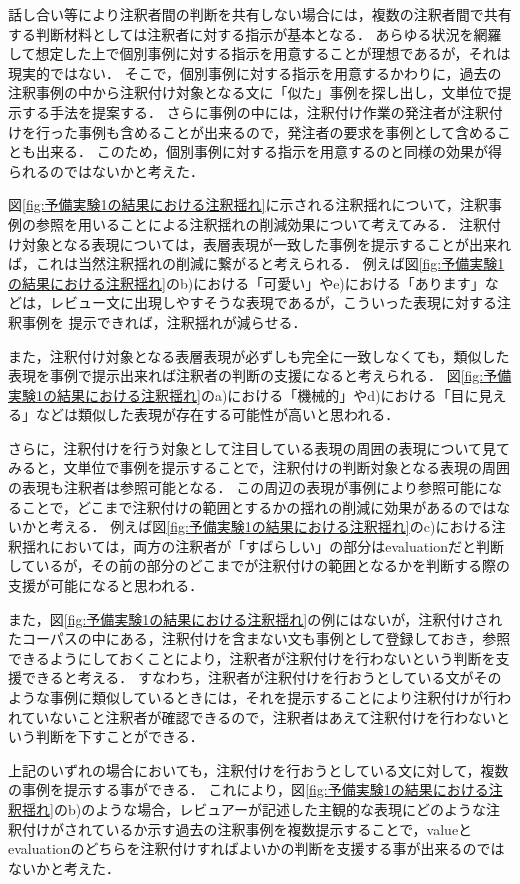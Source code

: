 \documentclass[japanese]{jnlp_1.4}
\begin{document}
話し合い等により注釈者間の判断を共有しない場合には，複数の注釈者間で共有する判断材料としては注釈者に対する指示が基本となる．
あらゆる状況を網羅して想定した上で個別事例に対する指示を用意することが理想であるが，それは現実的ではない．
そこで，個別事例に対する指示を用意するかわりに，過去の注釈事例の中から注釈付け対象となる文に「似た」事例を探し出し，文単位で提示する手法を提案する．
さらに事例の中には，注釈付け作業の発注者が注釈付けを行った事例も含めることが出来るので，発注者の要求を事例として含めることも出来る．
このため，個別事例に対する指示を用意するのと同様の効果が得られるのではないかと考えた．

図\ref{fig:予備実験1の結果における注釈揺れ}に示される注釈揺れについて，注釈事例の参照を用いることによる注釈揺れの削減効果について考えてみる．
注釈付け対象となる表現については，表層表現が一致した事例を提示することが出来れば，これは当然注釈揺れの削減に繋がると考えられる．
例えば図\ref{fig:予備実験1の結果における注釈揺れ}のb)における「可愛い」やe)における「あります」などは，レビュー文に出現しやすそうな表現であるが，こういった表現に対する注釈事例を
提示できれば，注釈揺れが減らせる．

また，注釈付け対象となる表層表現が必ずしも完全に一致しなくても，類似した表現を事例で提示出来れば注釈者の判断の支援になると考えられる．
図\ref{fig:予備実験1の結果における注釈揺れ}のa)における「機械的」やd)における「目に見える」などは類似した表現が存在する可能性が高いと思われる．

さらに，注釈付けを行う対象として注目している表現の周囲の表現について見てみると，文単位で事例を提示することで，注釈付けの判断対象となる表現の周囲の表現も注釈者は参照可能となる．
この周辺の表現が事例により参照可能になることで，どこまで注釈付けの範囲とするかの揺れの削減に効果があるのではないかと考える．
例えば図\ref{fig:予備実験1の結果における注釈揺れ}のc)における注釈揺れにおいては，両方の注釈者が「すばらしい」の部分はevaluationだと判断しているが，その前の部分のどこまでが注釈付けの範囲となるかを判断する際の支援が可能になると思われる．

また，図\ref{fig:予備実験1の結果における注釈揺れ}の例にはないが，注釈付けされたコーパスの中にある，注釈付けを含まない文も事例として登録しておき，参照できるようにしておくことにより，注釈者が注釈付けを行わないという判断を支援できると考える．
すなわち，注釈者が注釈付けを行おうとしている文がそのような事例に類似しているときには，それを提示することにより注釈付けが行われていないこと注釈者が確認できるので，注釈者はあえて注釈付けを行わないという判断を下すことができる．

上記のいずれの場合においても，注釈付けを行おうとしている文に対して，複数の事例を提示する事ができる．
これにより，図\ref{fig:予備実験1の結果における注釈揺れ}のb)のような場合，レビュアーが記述した主観的な表現にどのような注釈付けがされているか示す過去の注釈事例を複数提示することで，valueとevaluationのどちらを注釈付けすればよいかの判断を支援する事が出来るのではないかと考えた．
\end{document}

